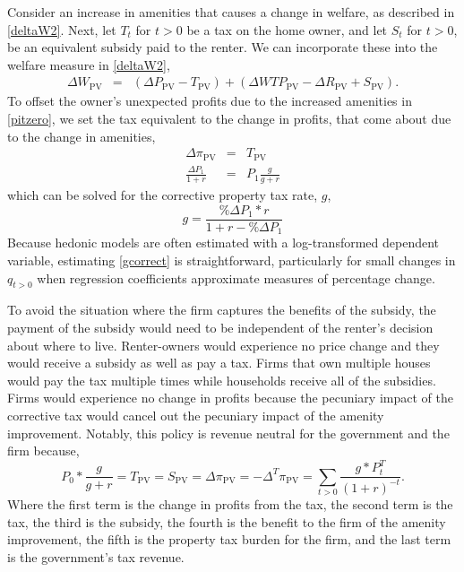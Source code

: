 \documentclass[ecta,nameyear,draft]{econsocart}
\theoremstyle{plain}
\theoremstyle{remark}
\begin{document}
Consider an increase in amenities that causes a change in welfare, as described in \ref{deltaW2}. Next, let $T_t$ for $t>0$ be a tax on the home owner, and let $S_t$ for $t>0$, be an equivalent subsidy paid to the renter. We can incorporate these into the welfare measure in \ref{deltaW2},
\begin{eqnarray*}
	\Delta W_{\mathrm{PV}}&=& \left(\Delta P_{\mathrm{PV}}-T_{\mathrm{PV}}\right)+\left(\Delta\mathit{WTP}_\mathrm{PV}-\Delta R_{\mathrm{PV}}+S_{\mathrm{PV}}\right).\nonumber
\end{eqnarray*}
To offset the owner's unexpected profits due to the increased amenities in \ref{pitzero}, we set the tax equivalent to the change in profits, that come about due to the change in amenities,
\begin{eqnarray*}
 \Delta \pi_{\mathrm{PV}}&=&T_{\mathrm{PV}}\\
\frac{\Delta P_1}{1+r}&=&P_1\frac{g}{g+r}
\end{eqnarray*}
which can be solved for the corrective property tax rate, $g$,
\begin{equation}
	g=\frac{\% \Delta P_1*r}{1+r-\% \Delta P_1} \label{gcorrect}
\end{equation}
Because hedonic models are often estimated with a log-transformed dependent variable, estimating \ref{gcorrect} is straightforward, particularly for small changes in $q_{t>0}$ when regression coefficients approximate measures of percentage change. 

To avoid the situation where the firm captures the benefits of the subsidy, the payment of the subsidy would need to be independent of the renter's decision about where to live. Renter-owners would experience no price change and they would receive a subsidy as well as pay a tax. Firms that own multiple houses would pay the tax multiple times while households receive all of the subsidies. Firms would experience no change in profits because the pecuniary impact of the corrective tax would cancel out the pecuniary impact of the amenity improvement.
Notably, this policy is revenue neutral for the government and the firm because, 
\begin{equation*}
	P_0*\frac{g}{g+r}=T_{\mathrm{PV}}=S_{\mathrm{PV}}=\Delta \pi_{\mathrm{PV}}=-\Delta^T \pi_{\mathrm{PV}}=\sum_{t>0}\frac{g*P_t^T}{(1+r)^{-t}}.
\end{equation*}
Where the first term is the change in profits from the tax, the second term is the tax, the third is the subsidy, the fourth is the benefit to the firm of the amenity improvement, the fifth is the property tax burden for the firm, and the last term is the government's tax revenue. 
\end{document}
